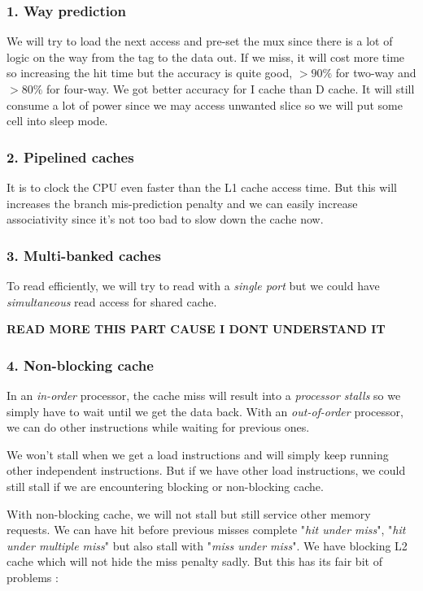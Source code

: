 \documentclass{report}
\begin{document}
\subsubsection{1. Way prediction}

We will try to load the next access and pre-set the mux since there is a lot of logic on the way from the tag to the data out. If we miss, it will cost more time so increasing the hit time but the accuracy is quite good, $>90\%$ for two-way and $>80\%$ for four-way. We got better accuracy for I cache than D cache. It will still consume a lot of power since we may access unwanted slice so we will put some cell into sleep mode.

\subsubsection{2. Pipelined caches}

It is to clock the CPU even faster than the L1 cache access time. But this will increases the branch mis-prediction penalty and we can easily increase associativity since it's not too bad to slow down the cache now.

\subsubsection{3. Multi-banked caches}

To read efficiently, we will try to read with a \textit{single port} but we could have \textit{simultaneous} read access for shared cache.

\textbf{READ MORE THIS PART CAUSE I DONT UNDERSTAND IT}

\subsubsection{4. Non-blocking cache}

In an \textit{in-order} processor, the cache miss will result into a \textit{processor stalls} so we simply have to wait until we get the data back. With an \textit{out-of-order} processor, we can do other instructions while waiting for previous ones.

We won't stall when we get a load instructions and will simply keep running other independent instructions. But if we have other load instructions, we could still stall if we are encountering blocking or non-blocking cache. 

With non-blocking cache, we will not stall but still service other memory requests. We can have hit before previous misses complete "\textit{hit under miss}", "\textit{hit under multiple miss}" but also stall with "\textit{miss under miss}". We have blocking L2 cache which will not hide the miss penalty sadly. But this has its fair bit of problems : 
\end{document}
